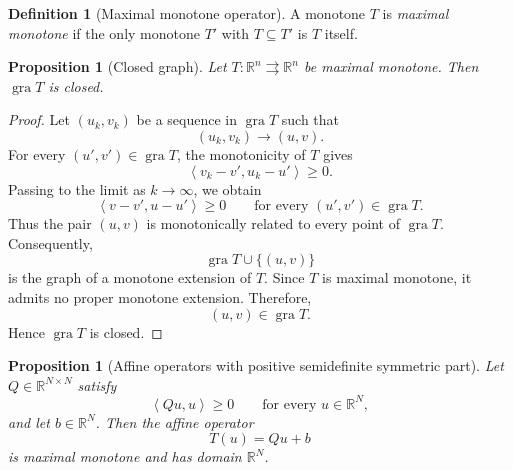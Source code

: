 \documentclass[a4paper,11pt]{book}
\theoremstyle{plain}
\newtheorem{proposition}[theorem]{Proposition}
\theoremstyle{definition}
\newtheorem{definition}[theorem]{Definition}
\theoremstyle{remark}
\numberwithin{equation}{chapter}
\numberwithin{algorithm}{chapter}
\newcommand{\R}{\mathbb{R}}
\newcommand{\inner}[2]{\left\langle #1, #2 \right\rangle}
\begin{document}
	\begin{definition}[Maximal monotone operator]
		A monotone $T$ is \emph{maximal monotone} if the only monotone $T'$ with
		$T\subseteq T'$ is $T$ itself.
	\end{definition}
	
	\begin{proposition}[Closed graph]
		Let \(T:\R^n\rightrightarrows\R^n\) be maximal monotone. Then
		\(\operatorname{gra}T\) is closed.
	\end{proposition}
	
	\begin{proof}
		Let \((u_k,v_k)\) be a sequence in \(\operatorname{gra}T\) such that
		\[
		(u_k,v_k)\longrightarrow(u,v).
		\]
		For every \((u',v')\in\operatorname{gra}T\), the monotonicity of \(T\) gives
		\[
		\inner{v_k-v'}{u_k-u'}\geq0.
		\]
		Passing to the limit as \(k\to\infty\), we obtain
		\[
		\inner{v-v'}{u-u'}\geq0
		\qquad
		\text{for every }(u',v')\in\operatorname{gra}T.
		\]
		Thus the pair \((u,v)\) is monotonically related to every point of
		\(\operatorname{gra}T\). Consequently,
		\[
		\operatorname{gra}T\cup\{(u,v)\}
		\]
		is the graph of a monotone extension of \(T\). Since \(T\) is maximal
		monotone, it admits no proper monotone extension. Therefore,
		\[
		(u,v)\in\operatorname{gra}T.
		\]
		Hence \(\operatorname{gra}T\) is closed.
	\end{proof}
	\begin{proposition}[Affine operators with positive semidefinite symmetric part]
		Let \(Q\in\R^{N\times N}\) satisfy
		\[
		\inner{Qu}{u}\geq0
		\qquad
		\text{for every }u\in\R^N,
		\]
		and let \(b\in\R^N\). Then the affine operator
		\[
		T(u)=Qu+b
		\]
		is maximal monotone and has domain \(\R^N\).
	\end{proposition}
	
\end{document}
